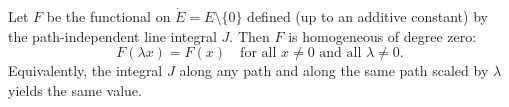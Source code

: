 Let $F$ be the functional on $\dot{E} = E \setminus \{0\}$ defined (up to an additive constant) by the path-independent line integral $J$. Then $F$ is homogeneous of degree zero:
$$F(\lambda x) = F(x) \quad \text{for all } x \neq 0 \text{ and all } \lambda \neq 0.$$
Equivalently, the integral $J$ along any path and along the same path scaled by $\lambda$ yields the same value.
